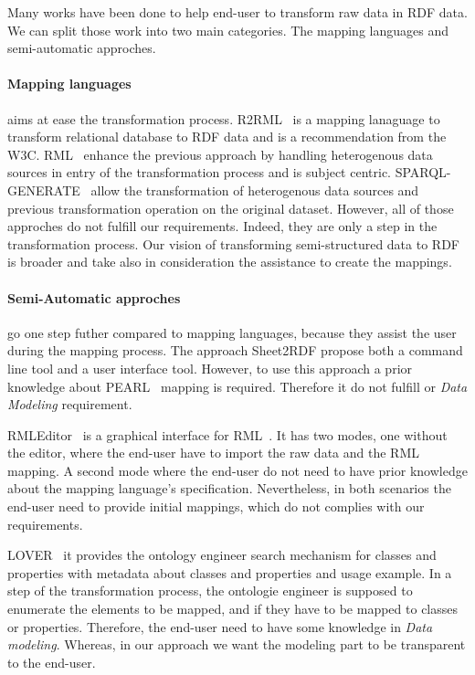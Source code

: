 Many works have been done to help end-user to transform raw data in RDF data. 
We can split those work into
two main categories. The mapping languages and semi-automatic approches.

\paragraph{Mapping languages} aims at ease the transformation process. R2RML~\cite{R2RML_W3C:12} is a mapping
lanaguage to transform relational database to RDF data and is a recommendation from the W3C. 
RML~\cite{dimou2014rml} enhance the previous approach by handling heterogenous data sources in entry of the
transformation process and is subject centric. SPARQL-GENERATE~\cite{lefranccois2016flexible} allow the
transformation of heterogenous data sources and previous transformation operation on the original dataset.
However, all of those approches do not fulfill our requirements.
Indeed, they are only a step in the transformation process.
Our vision of transforming semi-structured data to RDF is broader and take also in consideration the
assistance to create the mappings.

\paragraph{Semi-Automatic approches} go one step futher compared to mapping languages, because they assist
the user during the mapping process. The approach Sheet2RDF\cite{fiorelli2015sheet2rdf} propose both
a command line tool and a user interface tool. However, to use this approach a prior knowledge about
PEARL~\cite{pazienza2012pearl} mapping is required. Therefore it do not fulfill or \emph{Data Modeling}
requirement.

RMLEditor~\cite{heyvaert2016rmleditor} is a graphical interface for RML~\cite{dimou2014rml}. 
It has two modes, one without the editor, where the end-user have to import the raw data and the RML mapping.
A second mode where the end-user do not need to have prior knowledge about the mapping language's
specification. Nevertheless, in both scenarios the end-user need to provide initial
mappings, which do not complies with our requirements.

LOVER~\cite{schaible2013lover} it provides the ontology engineer search mechanism for
classes and properties with metadata about classes and properties and
usage example. In a step of the transformation process, the ontologie engineer is 
supposed to enumerate the elements to be mapped, and if they have to be mapped to classes
or properties. Therefore, the end-user  need to have some knowledge in 
\emph{Data modeling}. Whereas, in our approach we want the modeling part to be 
transparent to the end-user.

